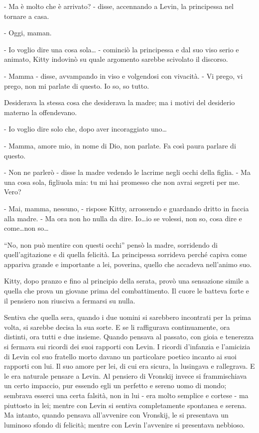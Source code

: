 - Ma è molto che è arrivato? - disse, accennando a Levin, la principessa nel tornare a casa. 

- Oggi, maman. 

- Io voglio dire una cosa sola\ldots{} - cominciò la principessa e dal suo viso serio e animato, Kitty indovinò su quale argomento sarebbe scivolato il discorso. 

- Mamma - disse, avvampando in viso e volgendosi con vivacità. - Vi prego, vi prego, non mi parlate di questo. Io so, so tutto. 

Desiderava la stessa cosa che desiderava la madre; ma i motivi del desiderio materno la offendevano. 

- Io voglio dire solo che, dopo aver incoraggiato uno\ldots{} 

- Mamma, amore mio, in nome di Dio, non parlate. Fa così paura parlare di questo. 

- Non ne parlerò - disse la madre vedendo le lacrime negli occhi della figlia. - Ma una cosa sola, figliuola mia: tu mi hai promesso che non avrai segreti per me. Vero? 

- Mai, mamma, nessuno, - rispose Kitty, arrossendo e guardando dritto in faccia alla madre. - Ma ora non ho nulla da dire. Io\ldots{}io se volessi, non so, cosa dire e come\ldots{}non so\ldots{} 

``No, non può mentire con questi occhi'' pensò la madre, sorridendo di quell'agitazione e di quella felicità. La principessa sorrideva perché capiva come appariva grande e importante a lei, poverina, quello che accadeva nell'animo suo. 

\label{xiii} 

Kitty, dopo pranzo e fino al principio della serata, provò una sensazione simile a quella che prova un giovane prima del combattimento. Il cuore le batteva forte e il pensiero non riusciva a fermarsi su nulla. 

Sentiva che quella sera, quando i due uomini si sarebbero incontrati per la prima volta, si sarebbe decisa la sua sorte. E se li raffigurava continuamente, ora distinti, ora tutti e due insieme. Quando pensava al passato, con gioia e tenerezza si fermava sui ricordi dei suoi rapporti con Levin. I ricordi d'infanzia e l'amicizia di Levin col suo fratello morto davano un particolare poetico incanto ai suoi rapporti con lui. Il suo amore per lei, di cui era sicura, la lusingava e rallegrava. E le era naturale pensare a Levin. Al pensiero di Vronskij invece si frammischiava un certo impaccio, pur essendo egli un perfetto e sereno uomo di mondo; sembrava esserci una certa falsità, non in lui - era molto semplice e cortese - ma piuttosto in lei; mentre con Levin si sentiva completamente spontanea e serena. Ma intanto, quando pensava all'avvenire con Vronskij, le si presentava un luminoso sfondo di felicità; mentre con Levin l'avvenire si presentava nebbioso. 

